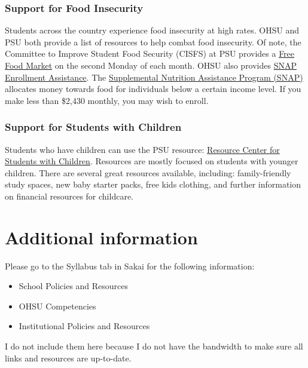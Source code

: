 \documentclass[
  letterpaper,
  DIV=11,
  numbers=noendperiod]{scrartcl}
\begin{document}
\subsubsection{Support for Food
Insecurity}\label{support-for-food-insecurity}

Students across the country experience food insecurity at high rates.
OHSU and PSU both provide a list of resources to help combat food
insecurity. Of note, the Committee to Improve Student Food Security
(CISFS) at PSU provides a
\href{https://www.pdx.edu/student-access-center/free-food-market}{Free
Food Market} on the second Monday of each month. OHSU also provides
\href{https://o2.ohsu.edu/student-central/health-wellness/student-food-resources/snap.cfm}{SNAP
Enrollment Assistance}. The
\href{https://oregonhunger.org/snap-for-students/}{Supplemental
Nutrition Assistance Program (SNAP)} allocates money towards food for
individuals below a certain income level. If you make less than \$2,430
monthly, you may wish to enroll.

\subsubsection{Support for Students with
Children}\label{support-for-students-with-children}

Students who have children can use the PSU resource:
\href{https://www.pdx.edu/students-with-children/}{Resource Center for
Students with Children}. Resources are mostly focused on students with
younger children. There are several great resources available,
including: family-friendly study spaces, new baby starter packs, free
kids clothing, and further information on financial resources for
childcare.

\section{Additional information}\label{additional-information}

Please go to the Syllabus tab in Sakai for the following information:

\begin{itemize}
\item
  School Policies and Resources
\item
  OHSU Competencies
\item
  Institutional Policies and Resources
\end{itemize}

I do not include them here because I do not have the bandwidth to make
sure all links and resources are up-to-date.
\end{document}
